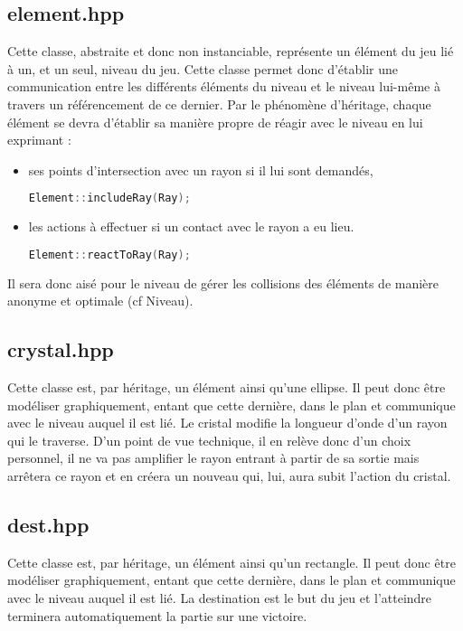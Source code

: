 \documentclass[a4paper,11pt]{report}
\begin{document}
\subsection[Element]{element.hpp}
Cette classe, abstraite et donc non instanciable, représente un élément du jeu
lié à un, et un seul, niveau du jeu. Cette classe permet donc d'établir une
communication entre les différents éléments du niveau et le niveau lui-même à
travers un référencement de ce dernier.
Par le phénomène d'héritage, chaque élément se devra d'établir sa manière propre de
réagir avec le niveau en lui exprimant : 
\begin{itemize}
	\item ses points d'intersection avec un rayon si il lui sont demandés,
		\begin{lstlisting}[language=C++]
		Element::includeRay(Ray);
		\end{lstlisting}
	\item les actions à effectuer si un contact avec le rayon a eu lieu.
		\begin{lstlisting}[language=C++]
		Element::reactToRay(Ray);
		\end{lstlisting}
\end{itemize}
Il sera donc aisé pour le niveau de gérer les collisions des éléments de manière
anonyme et optimale (cf Niveau).
\subsection[Cristal]{crystal.hpp}
\begin{center}
\end{center}
Cette classe est, par héritage, un élément ainsi qu'une ellipse. Il peut donc
être modéliser graphiquement, entant que cette dernière, dans le plan et communique avec
le niveau auquel il est lié. Le cristal modifie la longueur d'onde d'un rayon
qui le traverse. D'un point de vue technique, il en relève donc d'un choix
personnel, il ne va pas amplifier le rayon entrant à partir de sa sortie mais 
arrêtera ce rayon et en créera un nouveau qui, lui, aura subit l'action du cristal.
\subsection[Destination]{dest.hpp}
Cette classe est, par héritage, un élément ainsi qu'un rectangle. Il peut donc
être modéliser graphiquement, entant que cette dernière, dans le plan et
communique avec le niveau auquel il est lié. La destination est le but du jeu
et l'atteindre terminera automatiquement la partie sur une victoire.
\end{document}
